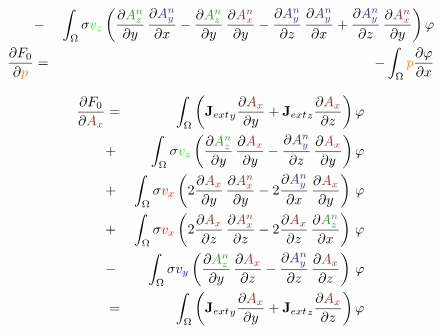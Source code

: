 \documentclass[smallextended]{svjour3}       %
\begin{document}
\begin{eqnarray}
			& - &\int_{\Omega} \sigma \textcolor{gre}{v_z} \left(\frac{\partial \textcolor{darkgre}{A_z^n}}{\partial y}\,\frac{\partial \textcolor{darkblu}{A_y^n}}{\partial x} - \frac{\partial \textcolor{darkgre}{A_z^n}}{\partial y}\,\frac{\partial \textcolor{darkred}{A_x^n}}{\partial y} - \frac{\partial \textcolor{darkblu}{A_y^n}}{\partial z}\,\frac{\partial \textcolor{darkblu}{A_y^n}}{\partial x} + \frac{\partial \textcolor{darkblu}{A_y^n}}{\partial z}\,\frac{\partial \textcolor{darkred}{A_x^n}}{\partial y} \right) \varphi \\			
			\frac{\partial F_0}{\partial \textcolor{orange}{p}} & = &
		- \int_{\Omega} \textcolor{orange}{p} \frac{\partial \varphi}{\partial x}
			\end{eqnarray}
			
			\begin{eqnarray}
			\frac{\partial F_0}{\partial \textcolor{darkred}{A_x}} & = &
			\int_{\Omega} \left({\mathbf{J}_{ext}}_y \frac{\partial \textcolor{darkred}{A_x}}{\partial y} + {\mathbf{J}_{ext}}_z \frac{\partial \textcolor{darkred}{A_x}}{\partial z}\right) \varphi			
			\nonumber \\
			& + &\int_{\Omega} \sigma \textcolor{gre}{v_z} \left(\frac{\partial \textcolor{darkgre}{A_z^n}}{\partial y}\,\frac{\partial \textcolor{darkred}{A_x}}{\partial y} - \frac{\partial \textcolor{darkblu}{A_y^n}}{\partial z}\,\frac{\partial \textcolor{darkred}{A_x}}{\partial y} \right) \varphi \nonumber \\			
			& + & \int_{\Omega} \sigma \textcolor{red}{v_x} \left( 2 \frac{\partial \textcolor{darkred}{A_x}}{\partial y}\,\frac{\partial \textcolor{darkred}{A_x^n}}{\partial y} - 2 \frac{\partial \textcolor{darkblu}{A_y^n}}{\partial x}\,\frac{\partial \textcolor{darkred}{A_x}}{\partial y} \right)\, \varphi \nonumber \\			
			& + & \int_{\Omega} \sigma \textcolor{red}{v_x} \left(2 \frac{\partial \textcolor{darkred}{A_x}}{\partial z}\,\frac{\partial \textcolor{darkred}{A_x^n}}{\partial z} - 2 \frac{\partial \textcolor{darkred}{A_x}}{\partial z}\,\frac{\partial \textcolor{darkgre}{A_z^n}}{\partial x} \right)\, \varphi \nonumber \\			
			& - & \int_{\Omega} \sigma \textcolor{blu}{v_y} \left(\frac{\partial \textcolor{darkgre}{A_z^n}}{\partial y}\,\frac{\partial \textcolor{darkred}{A_x}}{\partial z} - \frac{\partial \textcolor{darkblu}{A_y^n}}{\partial z}\,\frac{\partial \textcolor{darkred}{A_x}}{\partial z} \right)\, \varphi\\
			 & = &
			\int_{\Omega} \left({\mathbf{J}_{ext}}_y \frac{\partial \textcolor{darkred}{A_x}}{\partial y} + {\mathbf{J}_{ext}}_z \frac{\partial \textcolor{darkred}{A_x}}{\partial z}\right) \varphi			

\end{eqnarray}
\end{document}
